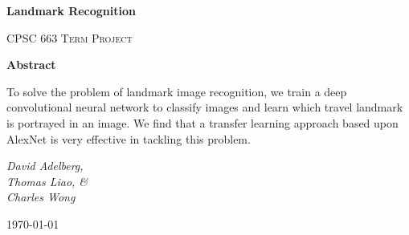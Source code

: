 \begin{titlepage}
	\centering
	{\vspace*{1cm}
	\huge\bfseries Landmark Recognition\par}
	\vspace{1cm}
	\par
	\vspace{1cm}
	{\scshape\Large CPSC 663 Term Project\par}
	\vspace{1cm}
	\large \textbf{Abstract}\par
	To solve the problem of landmark image recognition, we train a deep convolutional neural network to classify images and learn which travel landmark is portrayed in an image. We find that a transfer learning approach based upon AlexNet is very effective in tackling this problem.
	
	\vspace{1cm}
	{\Large\itshape David Adelberg,\\Thomas Liao, \&\\Charles Wong\par}
	\vfill
	{\large \today\par}
\end{titlepage}